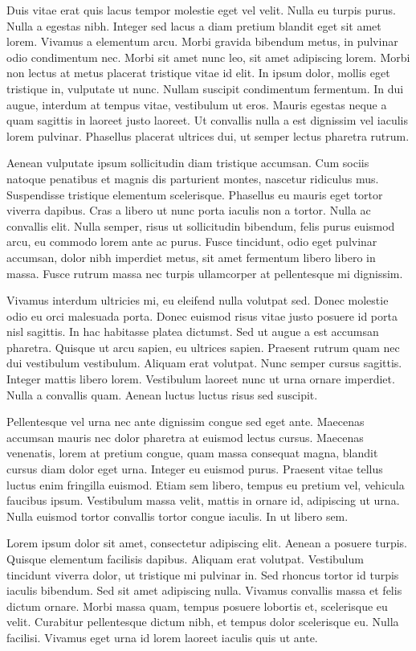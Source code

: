 \documentclass[a4paper]{article}
\begin{document}
Duis vitae erat quis lacus tempor molestie eget vel velit. Nulla eu turpis purus. Nulla a egestas nibh. Integer sed lacus a diam pretium blandit eget sit amet lorem. Vivamus a elementum arcu. Morbi gravida bibendum metus, in pulvinar odio condimentum nec. Morbi sit amet nunc leo, sit amet adipiscing lorem. Morbi non lectus at metus placerat tristique vitae id elit. In ipsum dolor, mollis eget tristique in, vulputate ut nunc. Nullam suscipit condimentum fermentum. In dui augue, interdum at tempus vitae, vestibulum ut eros. Mauris egestas neque a quam sagittis in laoreet justo laoreet. Ut convallis nulla a est dignissim vel iaculis lorem pulvinar. Phasellus placerat ultrices dui, ut semper lectus pharetra rutrum.

Aenean vulputate ipsum sollicitudin diam tristique accumsan. Cum sociis natoque penatibus et magnis dis parturient montes, nascetur ridiculus mus. Suspendisse tristique elementum scelerisque. Phasellus eu mauris eget tortor viverra dapibus. Cras a libero ut nunc porta iaculis non a tortor. Nulla ac convallis elit. Nulla semper, risus ut sollicitudin bibendum, felis purus euismod arcu, eu commodo lorem ante ac purus. Fusce tincidunt, odio eget pulvinar accumsan, dolor nibh imperdiet metus, sit amet fermentum libero libero in massa. Fusce rutrum massa nec turpis ullamcorper at pellentesque mi dignissim.

Vivamus interdum ultricies mi, eu eleifend nulla volutpat sed. Donec molestie odio eu orci malesuada porta. Donec euismod risus vitae justo posuere id porta nisl sagittis. In hac habitasse platea dictumst. Sed ut augue a est accumsan pharetra. Quisque ut arcu sapien, eu ultrices sapien. Praesent rutrum quam nec dui vestibulum vestibulum. Aliquam erat volutpat. Nunc semper cursus sagittis. Integer mattis libero lorem. Vestibulum laoreet nunc ut urna ornare imperdiet. Nulla a convallis quam. Aenean luctus luctus risus sed suscipit.

Pellentesque vel urna nec ante dignissim congue sed eget ante. Maecenas accumsan mauris nec dolor pharetra at euismod lectus cursus. Maecenas venenatis, lorem at pretium congue, quam massa consequat magna, blandit cursus diam dolor eget urna. Integer eu euismod purus. Praesent vitae tellus luctus enim fringilla euismod. Etiam sem libero, tempus eu pretium vel, vehicula faucibus ipsum. Vestibulum massa velit, mattis in ornare id, adipiscing ut urna. Nulla euismod tortor convallis tortor congue iaculis. In ut libero sem.

Lorem ipsum dolor sit amet, consectetur adipiscing elit. Aenean a posuere turpis. Quisque elementum facilisis dapibus. Aliquam erat volutpat. Vestibulum tincidunt viverra dolor, ut tristique mi pulvinar in. Sed rhoncus tortor id turpis iaculis bibendum. Sed sit amet adipiscing nulla. Vivamus convallis massa et felis dictum ornare. Morbi massa quam, tempus posuere lobortis et, scelerisque eu velit. Curabitur pellentesque dictum nibh, et tempus dolor scelerisque eu. Nulla facilisi. Vivamus eget urna id lorem laoreet iaculis quis ut ante.
\end{document}
